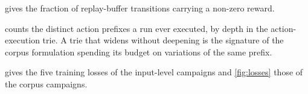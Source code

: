  gives the fraction of replay-buffer transitions carrying a
non-zero reward.



 counts the distinct action prefixes a run ever executed, by depth in the
action-execution trie.
A trie that widens without deepening is the signature of the corpus formulation spending its
budget on variations of the same prefix.



 gives the five training losses of the input-level campaigns and
\cref{fig:losses} those of the corpus campaigns.




